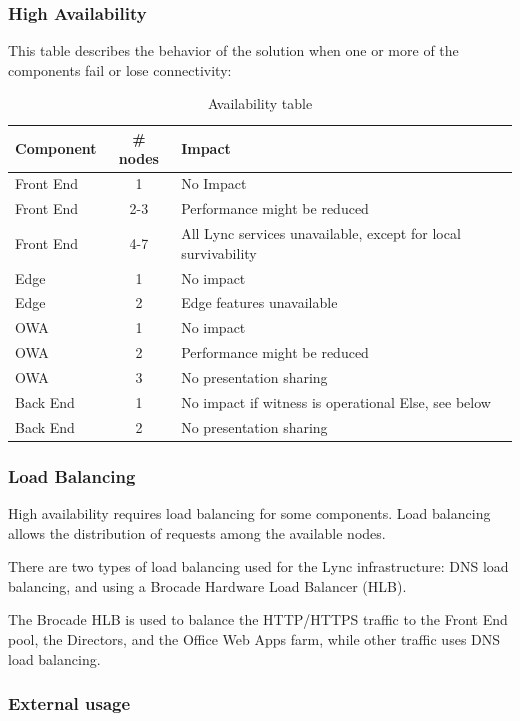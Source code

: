 \subsubsection{High Availability}
This table describes the behavior of the solution when one or more of the components fail or lose connectivity:

\begin{table}[H]
		\centering
		\begin{tabular}{lcl}
			Component & \# nodes & Impact  \\ \hline 
			Front End & 1 & No Impact \\
			Front End & 2-3 & Performance might be reduced \\
			Front End & 4-7 & All Lync services unavailable, except for local survivability \\
			Edge & 1 & No impact \\
			Edge & 2 & Edge features unavailable \\
			OWA & 1 & No impact \\
			OWA & 2 & Performance might be reduced \\
			OWA & 3 & No presentation sharing \\
			Back End & 1 & No impact if witness is operational \newline Else, see below\\
			Back End & 2 & No presentation sharing \\
		\end{tabular}
		\caption{\label{tab:case_ha} Availability table}
		\end{table}


\subsubsection{Load Balancing}
High availability requires load balancing for some components. Load balancing allows the distribution of requests among the available nodes.

There are two types of load balancing used for the Lync infrastructure: DNS load balancing, and using a Brocade Hardware Load Balancer (HLB).

The Brocade HLB is used to balance the HTTP/HTTPS traffic to the Front End pool, the Directors, and the Office Web Apps farm, while other traffic uses DNS load balancing.



\subsubsection{External usage}

